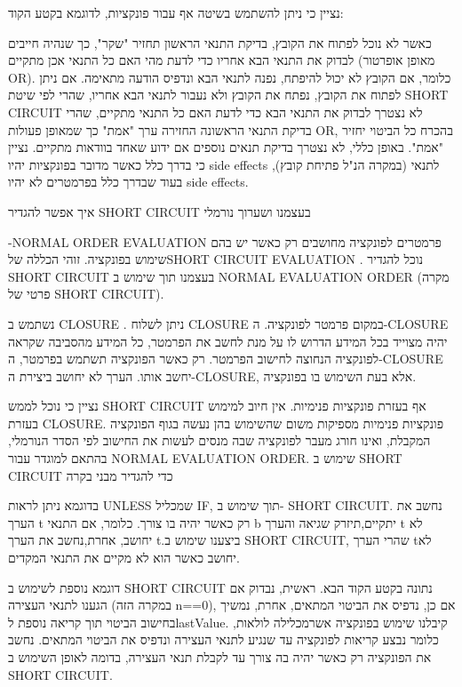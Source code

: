 \begin{טבלא}[!htbp]
        נציין כי ניתן להשתמש בשיטה אף עבור פונקציות, לדוגמא בקטע הקוד:

        כאשר לא נוכל לפתוח את הקובץ, בדיקת התנאי הראשון תחזיר "שקר", כך שנהיה חייבים
        לבדוק את התנאי הבא אחריו כדי לדעת מהי האם כל התנאי אכן מתקיים (מאופן אופרטור
        OR). כלומר, אם הקובץ לא יכול להיפתח, נפנה לתנאי הבא ונדפיס הודעה מתאימה. אם
        ניתן לפתוח את הקובץ, נפתח את הקובץ ולא נעבור לתנאי הבא אחריו, שהרי לפי שיטת
        SHORT CIRCUIT לא נצטרך לבדוק את התנאי הבא כדי לדעת האם כל התנאי מתקיים, שהרי
        בדיקת התנאי הראשונה החזירה ערך "אמת" כך שמאופן פעולות OR, בהכרח כל הביטוי
        יחזיר "אמת". באופן כללי, לא נצטרך בדיקת תנאים נוספים אם ידוע שאחד בוודאות
        מתקיים. נציין כי בדרך כלל כאשר מדובר בפונקציות יהיו side effects לתנאי
        (במקרה הנ"ל פתיחת קובץ), בעוד שבדרך כלל בפרמטרים לא יהיו side effects.

        איך אפשר להגדיר SHORT CIRCUIT בעצמנו ושערוך נורמלי

        -NORMAL ORDER EVALUATION פרמטרים לפונקציה מחושבים רק כאשר יש בהם שימוש
        בפונקציה. זוהי הכללה שלSHORT CIRCUIT EVALUATION . נוכל להגדיר SHORT CIRCUIT
        בעצמנו תוך שימוש ב NORMAL EVALUATION ORDER (מקרה פרטי של SHORT CIRCUIT).

        נשתמש ב CLOSURE . ניתן לשלוח CLOSURE במקום פרמטר לפונקציה. ה-CLOSURE יהיה
        מצוייד בכל המידע הדרוש לו על מנת לחשב את הפרמטר, כל המידע מהסביבה שקראה
        לפונקציה הנחוצה לחישוב הפרמטר. רק כאשר הפונקציה תשתמש בפרמטר, ה-CLOSURE יחשב
        אותו. הערך לא יחושב ביצירת ה-CLOSURE, אלא בעת השימוש בו בפונקציה.

        נציין כי נוכל לממש SHORT CIRCUIT אף בעזרת פונקציות פנימיות. אין חיוב למימוש
        בעזרת CLOSURE. פונקציות פנימיות מספיקות משום שהשימוש בהן נעשה בגוף הפונקציה
        המקבלת, ואינו חורג מעבר לפונקציה שבה מנסים לעשות את החישוב לפי הסדר הנורמלי,
        בהתאם למוגדר עבור NORMAL EVALUATION ORDER. שימוש ב SHORT CIRCUIT כדי להגדיר
        מבני בקרה

        בדוגמא ניתן לראות UNLESS שמכליל IF, תוך שימוש ב- SHORT CIRCUIT. נחשב את הערך
        t רק כאשר יהיה בו צורך. כלומר, אם התנאי b יתקיים,תיזרק שגיאה והערך t לא יחושב,
        אחרת,נחשב את הערך t.ביצענו שימוש ב SHORT CIRCUIT, שהרי הערך tלא יחושב כאשר הוא
        לא מקיים את התנאי המקדים.

        דוגמא נוספת לשימוש ב SHORT CIRCUIT נתונה בקטע הקוד הבא. ראשית, נבדוק אם הגענו
        לתנאי העצירה (במקרה הזה n==0), אם כן, נדפיס את הביטוי המתאים, אחרת, נמשיך
        בחישוב הביטוי תוך קריאה נוספת לlastValue. קיבלנו שימוש בפונקציה אשרמכלילה
        לולאות, כלומר נבצע קריאות לפונקציה עד שנגיע לתנאי העצירה ונדפיס את הביטוי
        המתאים. נחשב את הפונקציה רק כאשר יהיה בה צורך עד לקבלת תנאי העצירה, בדומה לאופן
        השימוש ב SHORT CIRCUIT.


\end{טבלא}
